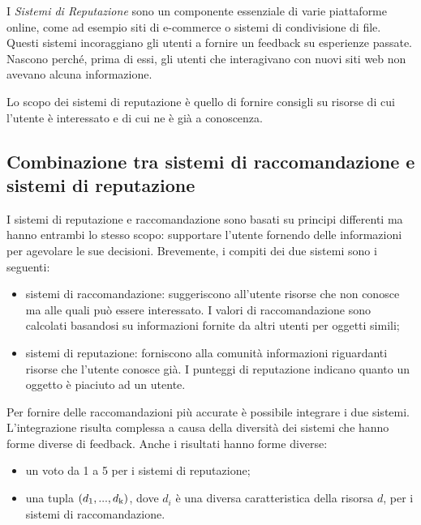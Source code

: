 \documentclass{report}
\begin{document}
	I \emph{Sistemi di Reputazione} sono un componente essenziale di varie
	piattaforme online, come ad esempio siti di e-commerce o sistemi di
	condivisione di file. Questi sistemi incoraggiano gli utenti a fornire
	un feedback su esperienze passate. Nascono perché, prima di essi, gli
	utenti che interagivano con nuovi siti web non avevano alcuna
	informazione.
	
	Lo scopo dei sistemi di reputazione è quello di fornire consigli su
	risorse di cui l'utente è interessato e di cui ne è già a conoscenza.
	
	\hypertarget{header-n20}{%
		\subsection{Combinazione tra sistemi di raccomandazione e sistemi di
			reputazione}\label{header-n20}}
	
	I sistemi di reputazione e raccomandazione
	sono basati su principi differenti ma hanno entrambi lo stesso scopo:
	supportare l'utente fornendo delle informazioni per agevolare le sue
	decisioni. Brevemente, i compiti dei due sistemi sono i seguenti:
	
	\begin{itemize}
		\item
		sistemi di raccomandazione: suggeriscono all'utente risorse che non
		conosce ma alle quali può essere interessato. I valori di
		raccomandazione sono calcolati basandosi su informazioni fornite da
		altri utenti per oggetti simili;
		\item
		sistemi di reputazione: forniscono alla comunità informazioni
		riguardanti risorse che l'utente conosce già. I punteggi di
		reputazione indicano quanto un oggetto è piaciuto ad un utente.
	\end{itemize}
	
	Per fornire delle raccomandazioni più accurate è possibile integrare i
	due sistemi. L'integrazione risulta complessa a causa della diversità
	dei sistemi che hanno forme diverse di feedback. Anche i risultati hanno
	forme diverse:
	
	\begin{itemize}
		\item
		un voto da 1 a 5 per i sistemi di reputazione;
		\item
		una tupla $(d\textsubscript{1}, ... , d\textsubscript{k})$, dove $d_i$ è una diversa caratteristica della
		risorsa $d$, per i sistemi di raccomandazione.
	\end{itemize}
	
\end{document}
